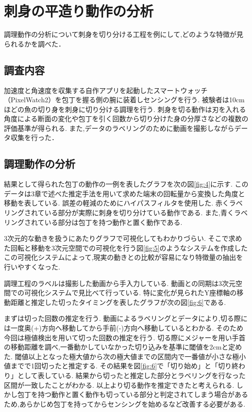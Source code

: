 \section{刺身の平造り動作の分析}
調理動作の分析について刺身を切り分ける工程を例にして,どのような特徴が見られるかを調べた．
\subsection{調査内容}
加速度と角速度を収集する自作アプリを起動したスマートウォッチ（PixelWatch2）を包丁を握る側の腕に装着しセンシングを行う.
被験者は10cmほどの魚の切り身を刺身に切り分ける調理を行う.
刺身を切る動作は刃を入れる角度による断面の変化や包丁を引く回数から切り分けた身の分厚さなどの複数の評価基準が得られる.
また,データのラベリングのために動画を撮影しながらデータ収集を行った．
\subsection{調理動作の分析}

結果として得られた包丁の動作の一例を表したグラフを次の図\ref{fig:4}に示す.
このデータは3章で述べた推定手法を用いて求めた端末の回転量から変換した角度と移動を表している.
誤差の軽減のためにハイパスフィルタを使用した.
赤くラベリングされている部分が実際に刺身を切り分けている動作である.
また,青くラベリングされている部分は包丁を持つ動作と置く動作である.

3次元的な動きを扱うにあたりグラフで可視化してもわかりづらい.
そこで求めた回転と移動を3次元空間での可視化を行う図\ref{fig:5}のようなシステムを作成した
この可視化システムによって,現実の動きとの比較が容易になり特徴量の抽出を行いやすくなった.

調理工程のラベルは撮影した動画から手入力している.
動画との同期は3次元空間での可視化システムで見比べて行っている.
特に変化が見られたY座標軸の移動距離と推定した切ったタイミングを表したグラフが次の図\ref{fig:6}である.


まずは切った回数の推定を行う.
動画によるラベリングとデータにより,切る際には一度奥(+)方向へ移動してから手前(-)方向へ移動しているとわかる.
そのため今回は極値検出を用いて切った回数の推定を行う.
切る際にメジャーを用い手首の移動距離を調べ,一番動かしていなかった切り込みを基準に閾値を2cmと定めた.
閾値以上となった極大値から次の極大値までの区間内で一番値が小さな極小値までで1回切ったと推定する.
その結果を図\ref{fig:6}で「切り始め」と「切り終わり」として表している.
結果から切ったと推定した部分とラベリングを行なった区間が一致したことがわかる.
以上より切る動作を推定できたと考えられる.
しかし包丁を持つ動作と置く動作も切っている部分と判定されてしまう場合があるため,あらかじめ包丁を持ってからセンシングを始めるなど改善する必要がある.

